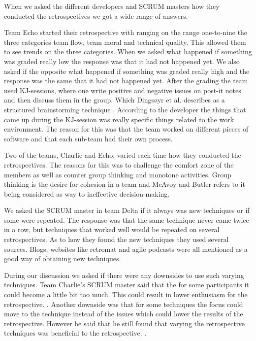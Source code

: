 \label{question-3}
When we asked the different developers and SCRUM masters how they conducted the retrospectives we got a wide range of answers. 

Team Echo started their retrospective with ranging on the range one-to-nine the three categories team flow, team moral and technical quality. This allowed them to see trends on the three categories. When we asked what happened if something was graded really low the response was that it had not happened yet. We also asked if the opposite what happened if something was graded really high and the response was the same that it had not happened yet. After the grading the team used KJ-sessions, where one write positive and negative issues on post-it notes and then discuss them in the group. Which Dingsøyr et al. describes as a structured brainstorming technique \cite{Dingsoyr2003}. According to the developer the things that came up during the KJ-session was really specific things related to the work environment. The reason for this was that the team worked on different pieces of software and that each sub-team had their own process. 

Two of the teams, Charlie and Echo, varied each time how they conducted the retrospectives. The reasons for this was to challenge the comfort zone of the members as well as counter group thinking and monotone activities. Group thinking is the desire for cohesion in a team and McAvoy and Butler \cite{Mcavoy2007} refers to it being considered as way to ineffective decision-making. 

We asked the SCRUM master in team Delta if it always was new techniques or if some were repeated. The response was that the same technique never came twice in a row, but techniques that worked well would be repeated on several retrospectives. As to how they found the new techniques they used several sources. Blogs, websites like retromat \cite{retromat2015} and agile podcasts were all mentioned as a good way of obtaining new techniques. 

During our discussion we asked if there were any downsides to use such varying techniques. Team Charlie's SCRUM master said that the for some participants it could become a little bit too much. This could result in lower enthusiasm for the retrospective. . Another downside was that for some techniques the focus could move to the technique instead of the issues which could lower the results of the retrospective. However he said that he still found that varying the retrospective techniques was beneficial to the retrospective. .

